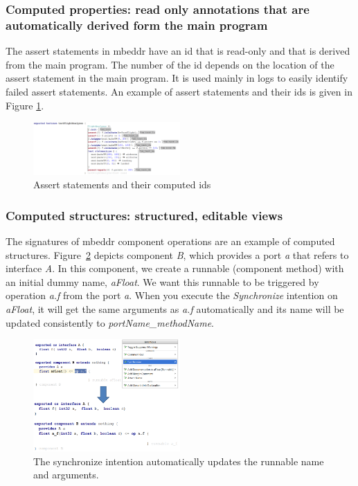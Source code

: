 \documentclass[preprint,numbers,10pt]{sigplanconf}
\begin{document}
\subsubsection{Computed properties: read only annotations that are automatically derived form the main program}
The assert statements in mbeddr have an id that is read-only and that is derived from the main program. The number of the
id depends on the location of the assert statement in the main program. It is used mainly in logs  to
easily identify failed assert statements. An example of assert statements and their ids is given in Figure \ref{fig:asserts}.

\begin{figure}[H]
	\centering
	\includegraphics[width=0.50\textwidth]{screens/testFlightAnalyzer.png}
	\caption{Assert statements and their computed ids}
	\label{fig:asserts}
\end{figure}
\subsubsection{Computed structures: structured, editable views}
The signatures of mbeddr component operations are an example of computed structures.
Figure~\ref{fig:ComputedStructures} depicts component \emph{B}, which provides a port \emph{a} that refers to interface \emph{A}.
In this component, we create a runnable (component method) with an initial dummy name, \emph{aFloat}. We want this
runnable to be triggered by operation \emph{a.f} from the port \emph{a}.
When you execute the \emph{Synchronize} intention on \emph{aFloat}, it will get the same arguments as \emph{a.f}
automatically and its name will be updated consistently to \emph{portName\_methodName}.

\begin{figure}[H]
	\centering
	\includegraphics[width=0.50\textwidth]{screens/ComputedStructures.png}
	\caption{The synchronize intention automatically updates the runnable name and arguments.}
	\label{fig:ComputedStructures}
\end{figure}
\end{document}
